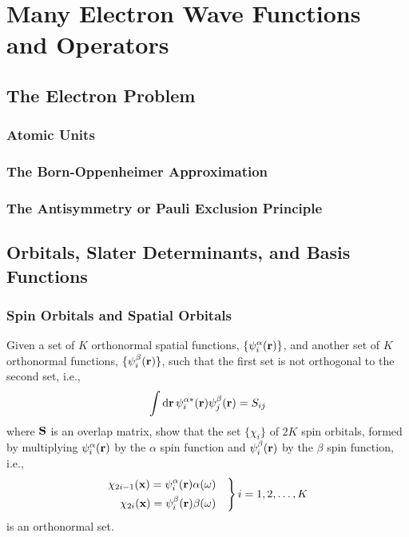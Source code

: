 \documentclass[a4paper]{book}
\newcounter{exercise}[chapter]
\newcommand*{\dif}{\mathop{}\!\mathrm{d}}
\newcommand{\bfr}{{\bf r}}
\newcommand{\bfx}{{\bf x}}
\begin{document}
	\tableofcontents

	\chapter{Many Electron Wave Functions and Operators}
	
	\section{The Electron Problem}
	
	\subsection{Atomic Units}
	
	\subsection{The Born-Oppenheimer Approximation}
	
	\subsection{The Antisymmetry or Pauli Exclusion Principle}
	
	\section{Orbitals, Slater Determinants, and Basis Functions}
	
	\subsection{Spin Orbitals and Spatial Orbitals}
	
	\begin{exercise}
	Given a set of $K$ orthonormal spatial functions, $\{\psi^\alpha_i(\bfr)\}$, and another set of $K$ orthonormal functions, $\{\psi^\beta_i(\bfr)\}$, such that the first set is not orthogonal to the second set, i.e., 
	\[
		\int \dif \bfr \, \psi^{\alpha*}_i( \bfr ) \psi^\beta_j( \bfr ) = S_{ij}
	\]
	where ${\bf S}$ is an overlap matrix, show that the set $\{ \chi_i \}$ of $2K$ spin orbitals, formed by multiplying $\psi^\alpha_i( \bfr )$ by the $\alpha$ spin function and $\psi^\beta_i( \bfr )$ by the $\beta$ spin function, i.e.,
	\[ \left.
	\begin{rgathered}
		\chi_{2i-1}(\bfx) = \psi^\alpha_i( \bfr ) \alpha( \omega ) \quad \\
		\chi_{2i}(\bfx) = \psi^\beta_i( \bfr ) \beta( \omega ) \quad
	\end{rgathered} \right\} i = 1, 2, \ldots, K
	\]
	is an orthonormal set.
	\end{exercise}
	
\end{document}
